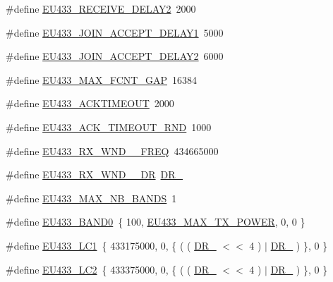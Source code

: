 \begin{DoxyCompactItemize}
\#define \hyperlink{group__REGIONEU433_ga305aa391ec1a9a008789076ebe87836d}{E\+U433\+\_\+\+R\+E\+C\+E\+I\+V\+E\+\_\+\+D\+E\+L\+A\+Y2}~2000
\item 
\#define \hyperlink{group__REGIONEU433_ga88e1bced3e9f82375d0c5918c5bdeb62}{E\+U433\+\_\+\+J\+O\+I\+N\+\_\+\+A\+C\+C\+E\+P\+T\+\_\+\+D\+E\+L\+A\+Y1}~5000
\item 
\#define \hyperlink{group__REGIONEU433_gab60dc1143d458c07ef3260a944ba0a7d}{E\+U433\+\_\+\+J\+O\+I\+N\+\_\+\+A\+C\+C\+E\+P\+T\+\_\+\+D\+E\+L\+A\+Y2}~6000
\item 
\#define \hyperlink{group__REGIONEU433_ga5b7094c08ac59b66204c07232e25671f}{E\+U433\+\_\+\+M\+A\+X\+\_\+\+F\+C\+N\+T\+\_\+\+G\+AP}~16384
\item 
\#define \hyperlink{group__REGIONEU433_gaa7d7d6a40fdb2b0a389a445ba851e39d}{E\+U433\+\_\+\+A\+C\+K\+T\+I\+M\+E\+O\+UT}~2000
\item 
\#define \hyperlink{group__REGIONEU433_gaa23479e6b2fa5b07245baccf6bed20d3}{E\+U433\+\_\+\+A\+C\+K\+\_\+\+T\+I\+M\+E\+O\+U\+T\+\_\+\+R\+ND}~1000
\item 
\#define \hyperlink{group__REGIONEU433_ga42387a283ba626367074fe6fdade4eb3}{E\+U433\+\_\+\+R\+X\+\_\+\+W\+N\+D\+\_\+\_\+\+F\+R\+EQ}~434665000
\item 
\#define \hyperlink{group__REGIONEU433_ga723d6db9265caf8f5c24545137764c41}{E\+U433\+\_\+\+R\+X\+\_\+\+W\+N\+D\+\_\+\_\+\+DR}~\hyperlink{group__REGION_ga6c4ef966b4f3d5eb7597b087f2b97095}{D\+R\+\_}
\item 
\#define \hyperlink{group__REGIONEU433_gaa45efc26cd18a760845f97a06f49bd9b}{E\+U433\+\_\+\+M\+A\+X\+\_\+\+N\+B\+\_\+\+B\+A\+N\+DS}~1
\item 
\#define \hyperlink{group__REGIONEU433_gaf5112336b60d5977ad6afc600e5b0154}{E\+U433\+\_\+\+B\+A\+N\+D0}~\{ 100, \hyperlink{group__REGIONEU433_gaac93ce9446f1e4b5c3c09c9b2ebf2297}{E\+U433\+\_\+\+M\+A\+X\+\_\+\+T\+X\+\_\+\+P\+O\+W\+ER}, 0,  0 \}
\item 
\#define \hyperlink{group__REGIONEU433_ga6daaeb48d51083fc5de9a57011ec3757}{E\+U433\+\_\+\+L\+C1}~\{ 433175000, 0, \{ ( ( \hyperlink{group__REGION_ga872e12c82020c02a7f70a1c6ed1375df}{D\+R\+\_} $<$$<$ 4 ) $\vert$ \hyperlink{group__REGION_ga6c4ef966b4f3d5eb7597b087f2b97095}{D\+R\+\_} ) \}, 0 \}
\item 
\#define \hyperlink{group__REGIONEU433_gae1c54a191172715ddc7c0c7f900009b7}{E\+U433\+\_\+\+L\+C2}~\{ 433375000, 0, \{ ( ( \hyperlink{group__REGION_ga872e12c82020c02a7f70a1c6ed1375df}{D\+R\+\_} $<$$<$ 4 ) $\vert$ \hyperlink{group__REGION_ga6c4ef966b4f3d5eb7597b087f2b97095}{D\+R\+\_} ) \}, 0 \}

\end{DoxyCompactItemize}
